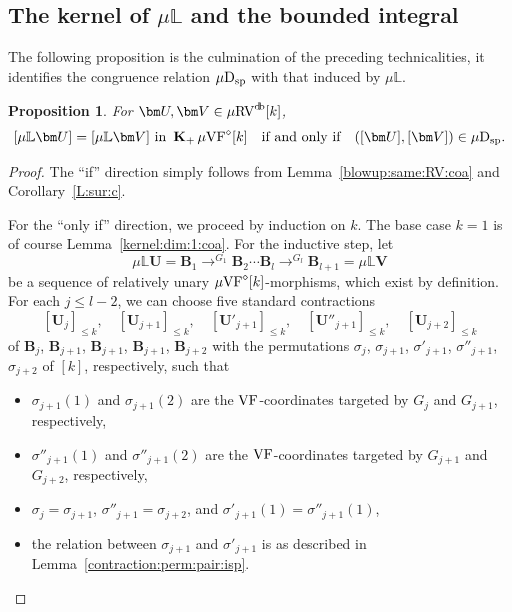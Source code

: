 \documentclass[12pt]{amsart}
\theoremstyle{plain}
\newtheorem{prop}[thm]{Proposition}
\theoremstyle{definition}
\theoremstyle{remark}
\numberwithin{equation}{section}
\theoremstyle{plain}
\newcommand{\VF}{\textup{VF}}
\newcommand{\RV}{\textup{RV}}
\newcommand{\0}{\emptyset}
\newcommand{\bb}[1]{\mathbb{#1}}
\newcommand{\mVF}{{\mu}{\VF}}
\newcommand{\mRV}{{\mu}{\RV}}
\newcommand{\dsp}{\textup{D}_{\textup{sp}}}
\newcommand{\mispdb}{\mu \dsp}
\newcommand{\mL}{{\mu}{\bb L}}
\DeclareMathOperator{\gsk}{\mathbf{K}_+}
\DeclareMathOperator{\db}{d \! b}
\begin{document}
\subsection{The kernel of $\mL$ and the bounded integral}

The following proposition is the culmination of the preceding technicalities, it identifies the
congruence relation  $\mispdb$ with that induced by
$\mL$.


\begin{prop}\label{kernel:L}
For $\bm U, \bm V \in \mRV^{\db}[k]$,
\[
[\mu\bb L \bm U] = [\mu\bb L \bm V] \text{ in }\gsk \mVF^\diamond[k] \quad \text{if and only if} \quad ([\bm U], [\bm V]) \in \mispdb.
\]
\end{prop}
\begin{proof}
The ``if'' direction simply follows from Lemma~\ref{blowup:same:RV:coa} and
Corollary~\ref{L:sur:c}.

For the ``only if'' direction, we proceed by induction on $k$. The base case $k = 1$ is of course Lemma~\ref{kernel:dim:1:coa}. For the inductive step, let
\[
\mu\bb L \bm U = \bm B_1 \to^{G_1} \bm B_2 \cdots \bm B_l \to^{G_l} \bm B_{l+1} = \mu\bb L \bm V
\]
be a sequence of relatively unary $\mVF^\diamond[k]$-morphisms, which exist by definition. For each $j \leq l - 2$, we can choose five standard contractions
\[
[\bm U_j]_{\leq k}, \quad [\bm U_{j+1}]_{\leq k}, \quad [\bm U'_{j+1}]_{\leq k}, \quad [\bm U''_{j+1}]_{\leq k}, \quad [\bm U_{j+2}]_{\leq k}
\]
of $\bm B_j$, $\bm B_{j+1}$, $\bm B_{j+1}$, $\bm B_{j+1}$, $\bm B_{j+2}$ with the permutations $\sigma_{j}$, $\sigma_{j+1}$, $\sigma'_{j+1}$, $\sigma''_{j+1}$, $\sigma_{j+2}$ of $[k]$, respectively, such that
\begin{itemize}
  \item $\sigma_{j+1}(1)$ and $\sigma_{j+1}(2)$ are the $\VF$-coordinates targeted by $G_{j}$ and $G_{j+1}$, respectively,
  \item $\sigma''_{j+1}(1)$ and $\sigma''_{j+1}(2)$ are the $\VF$-coordinates targeted by $G_{j+1}$ and $G_{j+2}$, respectively,
  \item $\sigma_{j} = \sigma_{j+1}$, $\sigma''_{j+1} =  \sigma_{j+2}$,  and $\sigma'_{j+1}(1) = \sigma''_{j+1}(1)$,
  \item the relation between $\sigma_{j+1}$ and $\sigma'_{j+1}$ is as described in Lemma~\ref{contraction:perm:pair:isp}.
\end{itemize}


\end{proof}
\end{document}
